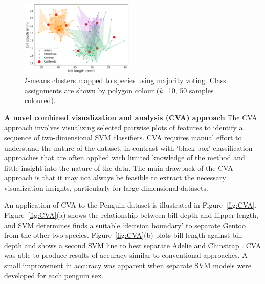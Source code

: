 \documentclass[12pt]{article}
\begin{document}
\begin{figure} %
  \centering
  \vspace{-1\baselineskip} %
  \includegraphics[width=0.48\textwidth]{kmeansmap.png} %
  \vspace{-0.5\baselineskip} %
  \caption{\centering\linespread{0.8}\selectfont \textit{k}-means clusters mapped to species using majority voting. 
  Class assignments are shown by polygon colour (\textit{k}=10, 50 samples coloured).}
  \vspace{-1\baselineskip} %
  \label{fig:kmeansmap}
\end{figure}

\textbf{A novel combined visualization and analysis (CVA) approach}  
The CVA approach involves visualizing selected pairwise plots of features 
to identify a sequence of two-dimensional SVM classifiers. 
CVA requires manual effort to understand the nature of the dataset, 
in contrast with `black box' classification approaches that are often applied with limited knowledge 
of the method and little insight into the nature of the data. 
The main drawback of the CVA approach is that it may not always be feasible to extract the necessary visualization insights, 
particularly for large dimensional datasets. 

An application of CVA to the Penguin dataset is illustrated in Figure~\ref{fig:CVA}. 
Figure~\ref{fig:CVA}(a) shows the relationship between bill depth and flipper length, and
SVM determines finds a suitable `decision boundary' to separate Gentoo from the other two species. 
Figure~\ref{fig:CVA}(b) plots bill length against bill depth and shows a second SVM line to best separate Adelie and Chinstrap . 
CVA was able to produce results of accuracy similar to conventional approaches. A small improvement in accuracy
was apparent when separate SVM models were developed for each penguin sex.
\end{document}
